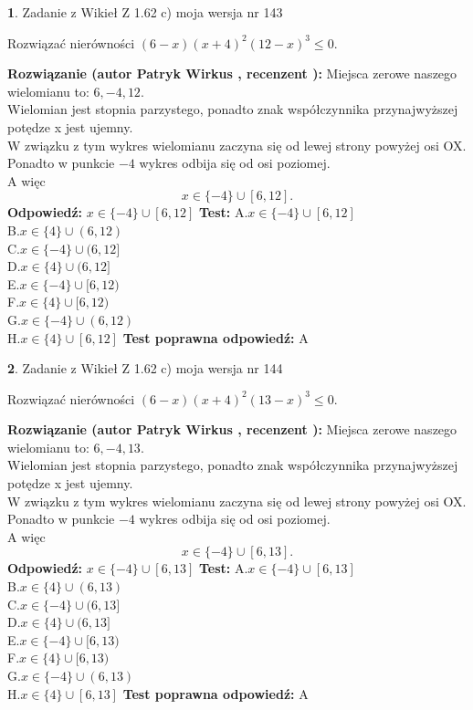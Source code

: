 \documentclass[12pt, a4paper]{article}
\theoremstyle{definition} %
\newtheorem{zad}{}
\newcommand{\zadStart}[1]{\begin{zad}#1\newline}
\newcommand{\zadStop}{\end{zad}}
\newcommand{\rozwStart}[2]{\noindent \textbf{Rozwiązanie (autor #1 , recenzent #2): }\newline}
\newcommand{\rozwStop}{\newline}
\newcommand{\odpStart}{\noindent \textbf{Odpowiedź:}\newline}
\newcommand{\odpStop}{\newline}
\newcommand{\testStart}{\noindent \textbf{Test:}\newline}
\newcommand{\testStop}{\newline}
\newcommand{\kluczStart}{\noindent \textbf{Test poprawna odpowiedź:}\newline}
\newcommand{\kluczStop}{\newline}
\begin{document}
\zadStart{Zadanie z Wikieł Z 1.62 c) moja wersja nr 143}

Rozwiązać nierówności $(6-x)(x+4)^{2}(12-x)^{3}\le0$.
\zadStop
\rozwStart{Patryk Wirkus}{}
Miejsca zerowe naszego wielomianu to: $6, -4, 12$.\\
Wielomian jest stopnia parzystego, ponadto znak współczynnika przy\linebreak najwyższej potędze x jest ujemny.\\ W związku z tym wykres wielomianu zaczyna się od lewej strony powyżej osi OX.\\
Ponadto w punkcie $-4$ wykres odbija się od osi poziomej.\\
A więc $$x \in \{-4\} \cup [6,12].$$
\rozwStop
\odpStart
$x \in \{-4\} \cup [6,12]$
\odpStop
\testStart
A.$x \in \{-4\} \cup [6,12]$\\
B.$x \in \{4\} \cup (6,12)$\\
C.$x \in \{-4\} \cup (6,12]$\\
D.$x \in \{4\} \cup (6,12]$\\
E.$x \in \{-4\} \cup [6,12)$\\
F.$x \in \{4\} \cup [6,12)$\\
G.$x \in \{-4\} \cup (6,12)$\\
H.$x \in \{4\} \cup [6,12]$
\testStop
\kluczStart
A
\kluczStop



\zadStart{Zadanie z Wikieł Z 1.62 c) moja wersja nr 144}

Rozwiązać nierówności $(6-x)(x+4)^{2}(13-x)^{3}\le0$.
\zadStop
\rozwStart{Patryk Wirkus}{}
Miejsca zerowe naszego wielomianu to: $6, -4, 13$.\\
Wielomian jest stopnia parzystego, ponadto znak współczynnika przy\linebreak najwyższej potędze x jest ujemny.\\ W związku z tym wykres wielomianu zaczyna się od lewej strony powyżej osi OX.\\
Ponadto w punkcie $-4$ wykres odbija się od osi poziomej.\\
A więc $$x \in \{-4\} \cup [6,13].$$
\rozwStop
\odpStart
$x \in \{-4\} \cup [6,13]$
\odpStop
\testStart
A.$x \in \{-4\} \cup [6,13]$\\
B.$x \in \{4\} \cup (6,13)$\\
C.$x \in \{-4\} \cup (6,13]$\\
D.$x \in \{4\} \cup (6,13]$\\
E.$x \in \{-4\} \cup [6,13)$\\
F.$x \in \{4\} \cup [6,13)$\\
G.$x \in \{-4\} \cup (6,13)$\\
H.$x \in \{4\} \cup [6,13]$
\testStop
\kluczStart
A
\kluczStop
\end{document}
